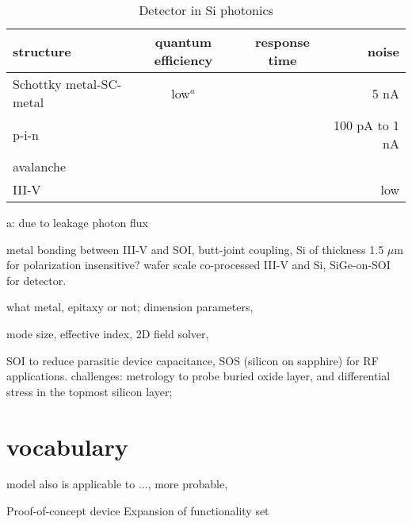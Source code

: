 \begin{table}[htb]
\centering
\caption{Detector in Si photonics}
\begin{tabular}{lccr}
\toprule
structure & quantum efficiency &  response time & noise   \\
\midrule
Schottky metal-SC-metal &   low$^a$     &           &  5 nA  \\
p-i-n                   &    &    & 100 pA to 1 nA  \\
avalanche               &    &    &    \\
III-V              &    &    &  low   \\
\bottomrule
\end{tabular}
a: due to leakage photon flux 

\end{table}

metal bonding between III-V and SOI, butt-joint coupling, Si of thickness 1.5 $\mu$m for polarization insensitive? wafer scale co-processed III-V and Si, SiGe-on-SOI for detector.

what metal, epitaxy or not; dimension parameters, 

mode size, effective index, 2D field solver, 

SOI to reduce parasitic device capacitance, SOS (silicon on sapphire) for RF applications. challenges: metrology to probe buried oxide layer, and differential stress in the topmost silicon layer; 



\section{vocabulary}

model also is applicable to ..., more probable, 

Proof-of-concept device
Expansion of functionality set 




